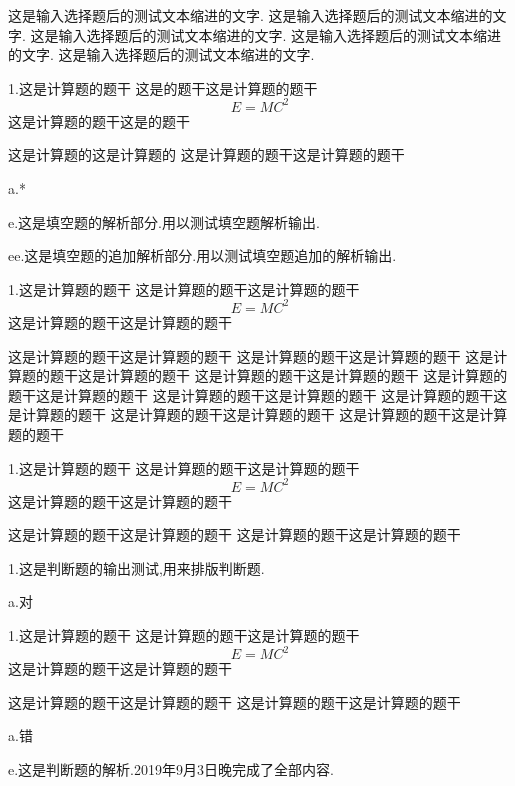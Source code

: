 \documentclass[a4paper,fontset = windows]{ctexbook}
\begin{document}
这是输入选择题后的测试文本缩进的文字.
这是输入选择题后的测试文本缩进的文字.
这是输入选择题后的测试文本缩进的文字.
这是输入选择题后的测试文本缩进的文字.
这是输入选择题后的测试文本缩进的文字.
\newpage
\begin{blanks}
1.这是计算题的题干
这是的题干这是计算题的题干
\begin{equation}
  E=MC^2
\end{equation}
这是计算题的题干这是的题干
这是计算题的这是计算题的
这是计算题的题干这是计算题的题干

a.*

e.这是填空题的解析部分.用以测试填空题解析输出.

ee.这是填空题的追加解析部分.用以测试填空题追加的解析输出.

1.这是计算题的题干
这是计算题的题干这是计算题的题干
\begin{equation}
  E=MC^2
\end{equation}
这是计算题的题干这是计算题的题干
这是计算题的题干这是计算题的题干
这是计算题的题干这是计算题的题干
这是计算题的题干这是计算题的题干
这是计算题的题干这是计算题的题干
这是计算题的题干这是计算题的题干
这是计算题的题干这是计算题的题干
这是计算题的题干这是计算题的题干
这是计算题的题干这是计算题的题干
这是计算题的题干这是计算题的题干
  
1.这是计算题的题干
这是计算题的题干这是计算题的题干
\begin{equation}
  E=MC^2
\end{equation}
这是计算题的题干这是计算题的题干
这是计算题的题干这是计算题的题干
这是计算题的题干这是计算题的题干

\end{blanks}


\newpage

\begin{judgements}
  1.这是判断题的输出测试,用来排版判断题.

  a.对

1.这是计算题的题干
这是计算题的题干这是计算题的题干
\begin{equation}
  E=MC^2
\end{equation}
这是计算题的题干这是计算题的题干
这是计算题的题干这是计算题的题干
这是计算题的题干这是计算题的题干

a.错

e.这是判断题的解析.2019年9月3日晚完成了全部内容.

\end{judgements}
\end{document}
